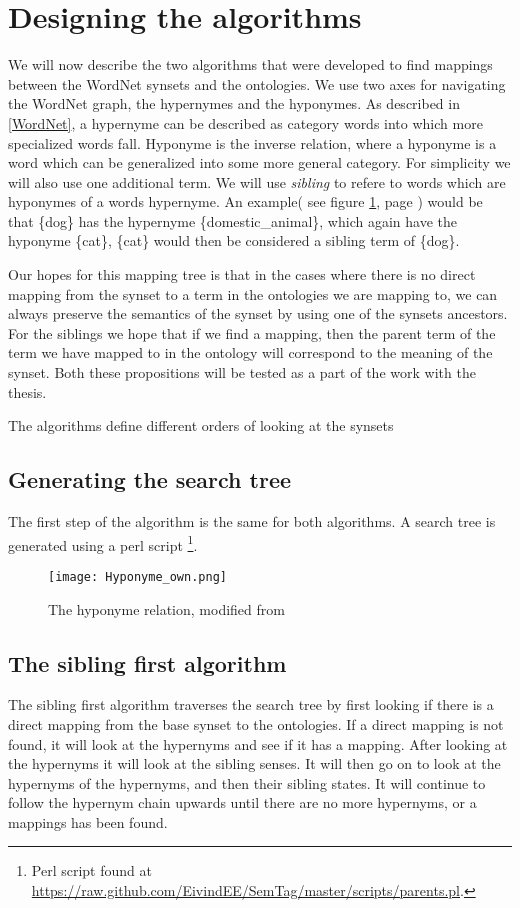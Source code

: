 \section{Designing the algorithms}
We will now describe the two algorithms that were developed to find mappings between the WordNet synsets and the ontologies.
We use two axes for navigating the WordNet graph, the hypernymes and the hyponymes.
As described in \ref{WordNet}, a hypernyme can be described as category words into which more specialized words fall.
Hyponyme is the inverse relation, where a hyponyme is a word which can be generalized into some more general category.
For simplicity we will also use one additional term.
We will use \emph{sibling} to refere to words which are hyponymes of a words hypernyme.
An example( see figure \ref{Hyponyme}, page \pageref{Hyponyme})
would be that \{dog\} has the hypernyme \{domestic\_animal\}, which again have the hyponyme \{cat\},
\{cat\} would then be considered a sibling term of \{dog\}.


Our hopes for this mapping tree is that in the cases where there is no direct mapping from the synset to a term in the
ontologies we are mapping to, we can always preserve the semantics of the synset by using one of the synsets ancestors.
For the siblings we hope that if we find a mapping,
then the parent term of the term we have mapped to in the ontology will correspond to the meaning of the synset.
Both these propositions will be tested as a part of the work with the thesis.

The algorithms define different orders of looking at the synsets

\subsection{Generating the search tree}
The first step of the algorithm is the same for both algorithms.
A search tree is generated using a perl script
\footnote{Perl script found at \url{https://raw.github.com/EivindEE/SemTag/master/scripts/parents.pl}.}.

\begin{figure}[h]
	\begin{center}
		\texttt{[image: Hyponyme\_own.png]}
		\caption{The hyponyme relation, modified from \protect \citet{Miller1990}}
		\label{Hyponyme}
	\end{center}
\end{figure}



\subsection{The sibling first algorithm}
The sibling first algorithm traverses the search tree by first looking if there is a direct mapping from the base synset to the ontologies.
If a direct mapping is not found, it will look at the hypernyms and see if it has a mapping.
After looking at the hypernyms it will look at the sibling senses.
It will then go on to look at the hypernyms of the hypernyms, and then their sibling states.
It will continue to follow the hypernym chain upwards until there are no more hypernyms, or a mappings has been found.

